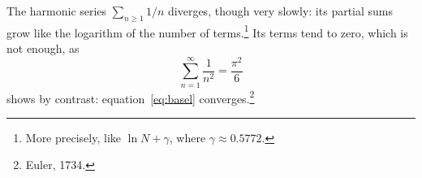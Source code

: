 The harmonic series $\sum_{n\ge1} 1/n$ diverges, though very slowly: its
partial sums grow like the logarithm of the number of terms.\footnote{More
precisely, like $\ln N + \gamma$, where $\gamma \approx 0.5772$.} Its terms
tend to zero, which is not enough, as
\begin{equation}\label{eq:basel}
  \sum_{n=1}^{\infty} \frac{1}{n^2} = \frac{\pi^2}{6}
\end{equation}
shows by contrast: equation~\eqref{eq:basel} converges.\footnote{Euler, 1734.}
